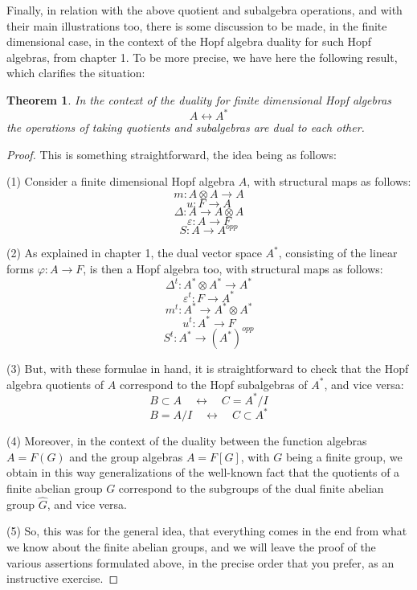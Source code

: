 \documentclass[12pt]{amsbook}
\newtheorem{theorem}{Theorem}[chapter]
\begin{document}
\bigskip

Finally, in relation with the above quotient and subalgebra operations, and with their main illustrations too, there is some discussion to be made, in the finite dimensional case, in the context of the Hopf algebra duality for such Hopf algebras, from chapter 1. To be more precise, we have here the following result, which clarifies the situation:

\begin{theorem}
In the context of the duality for finite dimensional Hopf algebras
$$A\leftrightarrow A^*$$
the operations of taking quotients and subalgebras are dual to each other.
\end{theorem}

\begin{proof}
This is something straightforward, the idea being as follows:

\medskip

(1) Consider a finite dimensional Hopf algebra $A$, with structural maps as follows:
$$m:A\otimes A\to A$$
$$u:F\to A$$
$$\Delta:A\to A\otimes A$$
$$\varepsilon:A\to F$$
$$S:A\to A^{opp}$$

(2) As explained in chapter 1, the dual vector space $A^*$, consisting of the linear forms $\varphi:A\to F$, is then a Hopf algebra too, with structural maps as follows:
$$\Delta^t:A^*\otimes A^*\to A^*$$
$$\varepsilon^t:F\to A^*$$
$$m^t:A^*\to A^*\otimes A^*$$
$$u^t:A^*\to F$$
$$S^t:A^*\to (A^*)^{opp}$$

(3) But, with these formulae in hand, it is straightforward to check that the Hopf algebra quotients of $A$ correspond to the Hopf subalgebras of $A^*$, and vice versa:
$$B\subset A\quad\longleftrightarrow\quad C=A^*/I$$
$$B=A/I\quad\longleftrightarrow\quad C\subset A^*$$

(4) Moreover, in the context of the duality between the function algebras $A=F(G)$ and the group algebras $A=F[G]$, with $G$ being a finite group, we obtain in this way generalizations of the well-known fact that the quotients of a finite abelian group $G$ correspond to the subgroups of the dual finite abelian group $\widehat{G}$, and vice versa.

\medskip

(5) So, this was for the general idea, that everything comes in the end from what we know about the finite abelian groups, and we will leave the proof of the various assertions formulated above, in the precise order that you prefer, as an instructive exercise. 
\end{proof}
\end{document}
